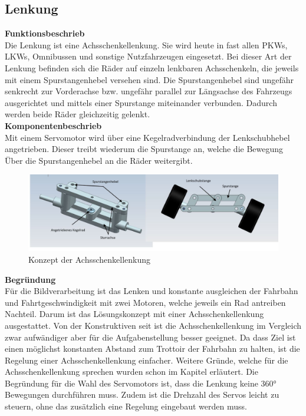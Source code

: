 \subsection{Lenkung}

\textbf{Funktionsbeschrieb}
\\[0.2cm]
Die Lenkung ist eine Achsschenkellenkung. Sie wird heute in fast allen PKWs, LKWs, Omnibussen und sonstige Nutzfahrzeugen eingesetzt. Bei dieser Art der Lenkung befinden sich die Räder auf einzeln lenkbaren Achsschenkeln, die jeweils mit einem Spurstangenhebel versehen sind. Die Spurstangenhebel sind ungefähr senkrecht zur Vorderachse bzw. ungefähr parallel zur Längsachse des Fahrzeugs ausgerichtet und mittels einer Spurstange miteinander verbunden. Dadurch werden beide Räder gleichzeitig gelenkt.\\[0.2cm]
\textbf{Komponentenbeschrieb}
\\[0.2cm]
Mit einem Servomotor wird über eine Kegelradverbindung der Lenkschubhebel angetrieben. Dieser treibt wiederum die Spurstange an, welche die Bewegung Über die Spurstangenhebel an die Räder weitergibt.
\begin{figure}[H]%
\centering
\includegraphics[width=1\textwidth]{03_Loesungskonzept/pictures/Achsschenkellenkung.JPG}
\caption{Konzept der Achsschenkellenkung}
\label{fig:activityRoute}
\end{figure}
\textbf{Begründung}\\[0.2cm]
Für die Bildverarbeitung ist das Lenken und konstante ausgleichen der Fahrbahn und Fahrtgeschwindigkeit mit zwei Motoren, welche jeweils ein Rad antreiben Nachteil. Darum ist das Lösungskonzept mit einer Achsschenkellenkung ausgestattet. Von der Konstruktiven seit ist die Achsschenkellenkung im Vergleich zwar aufwändiger aber für die Aufgabenstellung besser geeignet. Da dass Ziel ist einen möglichst konstanten Abstand zum Trottoir der Fahrbahn zu halten, ist die Regelung einer Achsschenkellenkung einfacher. Weitere Gründe, welche für die Achsschenkellenkung sprechen wurden schon im Kapitel \grqq  erläutert.
Die Begründung für die Wahl des Servomotors ist, dass die Lenkung keine 360° Bewegungen durchführen muss. Zudem ist die Drehzahl des Servos leicht zu steuern, ohne das zusätzlich eine Regelung eingebaut werden muss. 
